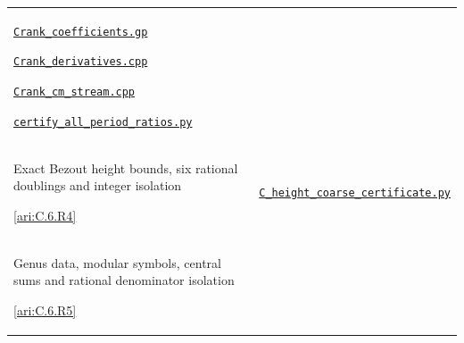 {\begin{longtable}{@{}>{\raggedright\arraybackslash}p{}>{\raggedright\arraybackslash}p{}@{}}
\href{https://raw.githubusercontent.com/KokunoYumeto/s6-complex-structure-workbench/\SsixRepositoryCommit/pro_returns/S6_10_PAPERS_checkpoint_15_20261119T1045Z/S6_10_PAPERS/code/I/replay_arithmetic/Crank_coefficients.gp}{\nolinkurl{Crank_coefficients.gp}}\par \href{https://raw.githubusercontent.com/KokunoYumeto/s6-complex-structure-workbench/\SsixRepositoryCommit/pro_returns/S6_10_PAPERS_checkpoint_15_20261119T1045Z/S6_10_PAPERS/code/I/replay_arithmetic/Crank_derivatives.cpp}{\nolinkurl{Crank_derivatives.cpp}}\par \href{https://raw.githubusercontent.com/KokunoYumeto/s6-complex-structure-workbench/\SsixRepositoryCommit/pro_returns/S6_10_PAPERS_checkpoint_15_20261119T1045Z/S6_10_PAPERS/code/I/replay_arithmetic/Crank_cm_stream.cpp}{\nolinkurl{Crank_cm_stream.cpp}}\par \href{https://raw.githubusercontent.com/KokunoYumeto/s6-complex-structure-workbench/\SsixRepositoryCommit/pro_returns/S6_10_PAPERS_checkpoint_15_20261119T1045Z/S6_10_PAPERS/code/I/certify_all_period_ratios.py}{\nolinkurl{certify_all_period_ratios.py}} \\[3pt]
\hypertarget{prog:I:coarse_height}{}Exact Bezout height bounds, six rational doublings and integer isolation\par \cref{ari:C.6.R4} &
\href{https://raw.githubusercontent.com/KokunoYumeto/s6-complex-structure-workbench/\SsixRepositoryCommit/pro_returns/S6_10_PAPERS_checkpoint_15_20261119T1045Z/S6_10_PAPERS/code/I/replay_arithmetic/C_height_coarse_certificate.py}{\nolinkurl{C_height_coarse_certificate.py}} \\[3pt]
\hypertarget{prog:I:leading_factors}{}Genus data, modular symbols, central sums and rational denominator isolation\par \cref{ari:C.6.R5} &

\end{longtable}}

